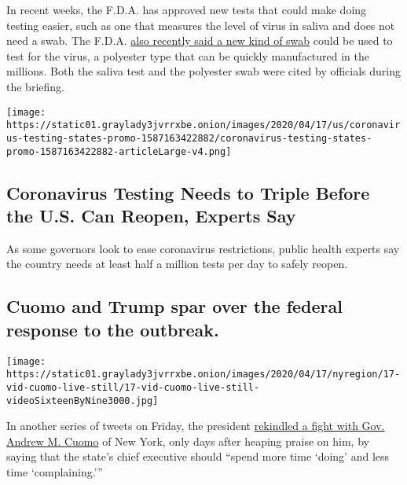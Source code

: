 In recent weeks, the F.D.A. has approved new tests that could make doing
testing easier, such as one that measures the level of virus in saliva
and does not need a swab. The F.D.A.
\href{https://www.fda.gov/news-events/press-announcements/coronavirus-covid-19-update-fda-gates-foundation-unitedhealth-group-quantigen-and-us-cotton}{also
recently said a new kind of swab} could be used to test for the virus, a
polyester type that can be quickly manufactured in the millions. Both
the saliva test and the polyester swab were cited by officials during
the briefing.

\href{https://www.nytimes3xbfgragh.onion/interactive/2020/04/17/us/coronavirus-testing-states.html}{}

\texttt{[image: https://static01.graylady3jvrrxbe.onion/images/2020/04/17/us/coronavirus-testing-states-promo-1587163422882/coronavirus-testing-states-promo-1587163422882-articleLarge-v4.png]}

\hypertarget{coronavirus-testing-needs-to-triple-before-the-us-can-reopen-experts-say}{%
\subsection{Coronavirus Testing Needs to Triple Before the U.S. Can
Reopen, Experts
Say}\label{coronavirus-testing-needs-to-triple-before-the-us-can-reopen-experts-say}}

As some governors look to ease coronavirus restrictions, public health
experts say the country needs at least half a million tests per day to
safely reopen.

\hypertarget{cuomo-and-trump-spar-over-the-federal-response-to-the-outbreak}{%
\subsection{Cuomo and Trump spar over the federal response to the
outbreak.}\label{cuomo-and-trump-spar-over-the-federal-response-to-the-outbreak}}

\texttt{[image: https://static01.graylady3jvrrxbe.onion/images/2020/04/17/nyregion/17-vid-cuomo-live-still/17-vid-cuomo-live-still-videoSixteenByNine3000.jpg]}

In another series of tweets on Friday, the president
\href{https://twitter.com/realDonaldTrump/status/1251181563506757632}{rekindled
a fight with Gov. Andrew M. Cuomo} of New York, only days after heaping
praise on him, by saying that the state's chief executive should ``spend
more time `doing' and less time `complaining.'''

